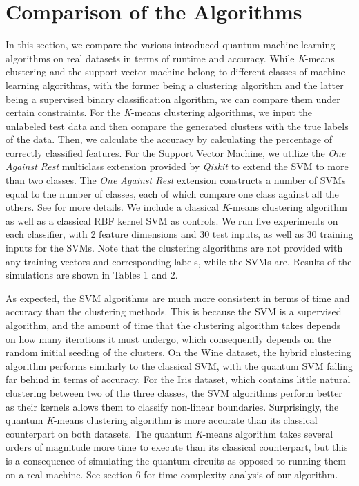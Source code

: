 \documentclass[twocolumn, english]{revtex4-2}
\begin{document}
\section{Comparison of the Algorithms}
In this section, we compare the various introduced quantum machine learning algorithms on real datasets in terms of runtime and accuracy. While \textit{K}-means clustering and the support vector machine belong to different classes of machine learning algorithms, with the former being a clustering algorithm and the latter being a supervised binary classification algorithm, we can compare them under certain constraints. For the \textit{K}-means clustering algorithms, we input the unlabeled test data and then compare the generated clusters with the true labels of the data. Then, we calculate the accuracy by calculating the percentage of correctly classified features. For the Support Vector Machine, we utilize the \textit{One Against Rest} multiclass extension provided by \textit{Qiskit} to extend the SVM to more than two classes. The \textit{One Against Rest} extension constructs a number of SVMs equal to the number of classes, each of which compare one class against all the others. See \cite{multiclass} for more details. We include a classical \textit{K}-means clustering algorithm as well as a classical RBF kernel SVM as controls. We run five experiments on each classifier, with 2 feature dimensions and 30 test inputs, as well as 30 training inputs for the SVMs. Note that the clustering algorithms are not provided with any training vectors and corresponding labels, while the SVMs are. Results of the simulations are shown in Tables 1 and 2.

As expected, the SVM algorithms are much more consistent in terms of time and accuracy than the clustering methods. This is because the SVM is a supervised algorithm, and the amount of time that the clustering algorithm takes depends on how many iterations it must undergo, which consequently depends on the random initial seeding of the clusters. On the Wine dataset, the hybrid clustering algorithm performs similarly to the classical SVM, with the quantum SVM falling far behind in terms of accuracy. For the Iris dataset, which contains little natural clustering between two of the three classes, the SVM algorithms perform better as their kernels allows them to classify non-linear boundaries. Surprisingly, the quantum \textit{K}-means clustering algorithm is more accurate than its classical counterpart on both datasets. The quantum \textit{K}-means algorithm takes several orders of magnitude more time to execute than its classical counterpart, but this is a consequence of simulating the quantum circuits as opposed to running them on a real machine. See section 6 for time complexity analysis of our algorithm.
\end{document}

